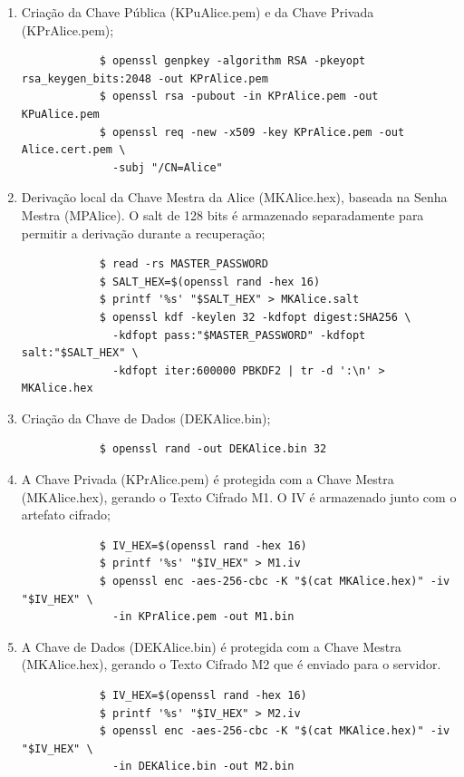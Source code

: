 \begin{enumerate}
	\item Criação da Chave Pública (KPuAlice.pem) e da Chave Privada (KPrAlice.pem);
	\begin{tcolorbox}[width=\textwidth]
		{\scriptsize
			\begin{verbatim}
			$ openssl genpkey -algorithm RSA -pkeyopt rsa_keygen_bits:2048 -out KPrAlice.pem
			$ openssl rsa -pubout -in KPrAlice.pem -out KPuAlice.pem
			$ openssl req -new -x509 -key KPrAlice.pem -out Alice.cert.pem \
			  -subj "/CN=Alice"
			\end{verbatim}
		}
	\end{tcolorbox}
	\item Derivação local da Chave Mestra da Alice (MKAlice.hex), baseada na Senha Mestra (MPAlice). O salt de 128 bits é armazenado separadamente para permitir a derivação durante a recuperação;
	\begin{tcolorbox}[width=\textwidth]
		{\scriptsize
			\begin{verbatim}
			$ read -rs MASTER_PASSWORD
			$ SALT_HEX=$(openssl rand -hex 16)
			$ printf '%s' "$SALT_HEX" > MKAlice.salt
			$ openssl kdf -keylen 32 -kdfopt digest:SHA256 \
			  -kdfopt pass:"$MASTER_PASSWORD" -kdfopt salt:"$SALT_HEX" \
			  -kdfopt iter:600000 PBKDF2 | tr -d ':\n' > MKAlice.hex
			\end{verbatim}
		}
	\end{tcolorbox}
	\item Criação da Chave de Dados (DEKAlice.bin);
	\begin{tcolorbox}[width=\textwidth]
		{\scriptsize
			\begin{verbatim}
			$ openssl rand -out DEKAlice.bin 32
			\end{verbatim}
		}
	\end{tcolorbox}
	\item A Chave Privada (KPrAlice.pem) é protegida com a Chave Mestra (MKAlice.hex), gerando o Texto Cifrado M1. O IV é armazenado junto com o artefato cifrado;
	\begin{tcolorbox}[width=\textwidth]
		{\scriptsize
			\begin{verbatim}
			$ IV_HEX=$(openssl rand -hex 16)
			$ printf '%s' "$IV_HEX" > M1.iv
			$ openssl enc -aes-256-cbc -K "$(cat MKAlice.hex)" -iv "$IV_HEX" \
			  -in KPrAlice.pem -out M1.bin
			\end{verbatim}
		}
	\end{tcolorbox}
	\item A Chave de Dados (DEKAlice.bin) é protegida com a Chave Mestra (MKAlice.hex), gerando o Texto Cifrado M2 que é enviado para o servidor.
	\begin{tcolorbox}[width=\textwidth]
		{\scriptsize
			\begin{verbatim}
			$ IV_HEX=$(openssl rand -hex 16)
			$ printf '%s' "$IV_HEX" > M2.iv
			$ openssl enc -aes-256-cbc -K "$(cat MKAlice.hex)" -iv "$IV_HEX" \
			  -in DEKAlice.bin -out M2.bin
			\end{verbatim}
		}
	\end{tcolorbox}
\end{enumerate}

